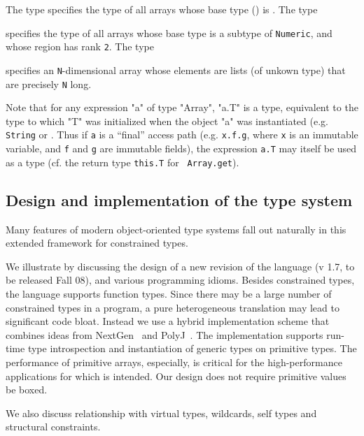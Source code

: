 The type  specifies the type of all arrays
whose base type () is . The type 

{\footnotesize 
{}
}

\noindent specifies the type of all arrays whose base
type is a subtype of {\tt Numeric}, and whose region has rank {\tt 2}.
The type 

{\footnotesize
{}
}

\noindent specifies an {\tt N}-dimensional array whose elements are lists (of
unkown type) that are precisely {\tt N} long.

Note that for any expression \xcd"a" of type \xcd"Array", \xcd"a.T" is
a type, equivalent to the type to which \xcd"T" was initialized when
the object \xcd"a" was instantiated (e.g.{} {\tt String} or .  Thus if {\tt a} is a ``final'' access path
(e.g. {\tt x.f.g}, where {\tt x} is an immutable variable, and {\tt f}
and {\tt g} are immutable fields), the expression {\tt a.T} may itself
be used as a type (cf. the return type {\tt this.T} for {\tt
Array.get}).

\subsection{Design and implementation of the \Xten{} type system}
Many features of modern object-oriented type systems fall out
naturally in this extended framework for constrained types.

We illustrate by discussing the design of a new revision of the
\Xten{} language (v 1.7, to be released Fall 08), and various
programming idioms. Besides constrained types, the language supports
function types. Since there may be a large number of constrained types
in a program, a pure heterogeneous translation may lead to significant
code bloat. Instead we use a hybrid implementation scheme that
combines ideas from NextGen~\cite{nextgen,allen03,allen04} and
PolyJ~\cite{java-popl97}. The implementation supports run-time type
introspection and instantiation of generic types on primitive types.
The performance of primitive arrays, especially, is critical for the
high-performance applications for which \Xten{} is intended.  Our
design does not require primitive values be boxed.

We also discuss relationship with virtual types, \Java{} wildcards,
self types and structural constraints.

